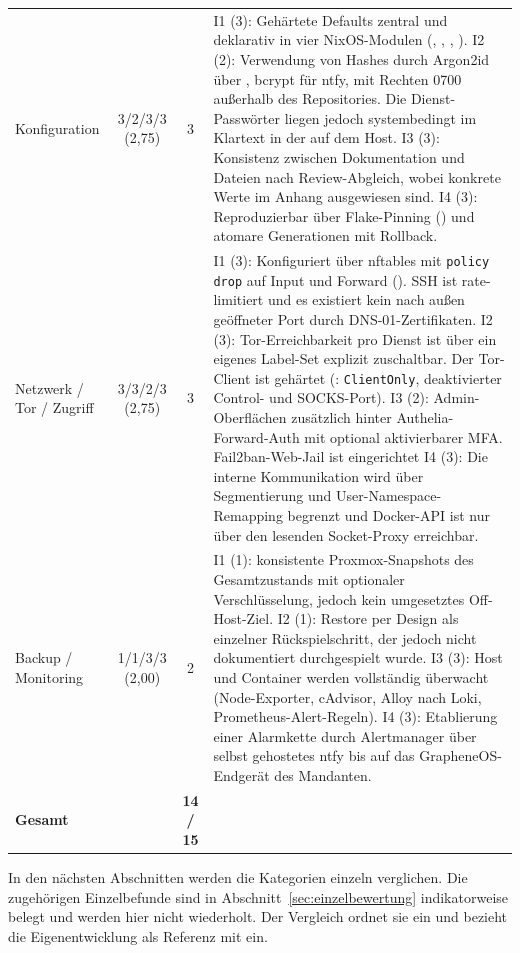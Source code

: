 \begin{xltabular}{\linewidth}{@{} p{2.9cm} c c >{\RaggedRight\arraybackslash}X @{}}
\addlinespace
Konfiguration & 3/2/3/3 (2{,}75) & 3 &
I1 (3): Gehärtete Defaults zentral und deklarativ in vier NixOS-Modulen (, , , ).
I2 (2): Verwendung von Hashes durch Argon2id über , bcrypt für ntfy,  mit Rechten 0700 außerhalb des Repositories. Die Dienst-Passwörter liegen jedoch systembedingt im Klartext in der  auf dem Host.
I3 (3): Konsistenz zwischen Dokumentation und Dateien nach Review-Abgleich, wobei konkrete Werte im Anhang ausgewiesen sind.
I4 (3): Reproduzierbar über Flake-Pinning () und atomare Generationen mit Rollback. \\
\addlinespace
Netzwerk / Tor / Zugriff & 3/3/2/3 (2{,}75) & 3 &
I1 (3): Konfiguriert über nftables mit \texttt{policy drop} auf Input und Forward (). \ac{SSH} ist rate-limitiert und es existiert kein nach außen geöffneter Port durch \ac{DNS}-01-Zertifikaten.
I2 (3): Tor-Erreichbarkeit pro Dienst ist über ein eigenes Label-Set explizit zuschaltbar. Der Tor-Client  ist gehärtet (: \texttt{ClientOnly}, deaktivierter Control- und \ac{SOCKS}-Port).
I3 (2): Admin-Oberflächen zusätzlich hinter Authelia-Forward-Auth mit optional aktivierbarer \acs{MFA}. Fail2ban-Web-Jail ist eingerichtet
I4 (3): Die interne Kommunikation wird über Segmentierung und User-Namespace-Remapping begrenzt und Docker-\ac{API} ist nur über den lesenden Socket-Proxy erreichbar. \\
\addlinespace
Backup / Monitoring & 1/1/3/3 (2{,}00) & 2 &
I1 (1): konsistente Proxmox-Snapshots des Gesamtzustands mit optionaler Verschlüsselung, jedoch kein umgesetztes Off-Host-Ziel.
I2 (1): Restore per Design als einzelner Rückspielschritt, der jedoch nicht dokumentiert durchgespielt wurde.
I3 (3): Host und Container werden vollständig überwacht (Node-Exporter, cAdvisor, Alloy nach Loki, Prometheus-Alert-Regeln).
I4 (3): Etablierung einer Alarmkette durch Alertmanager über selbst gehostetes ntfy bis auf das GrapheneOS-Endgerät des Mandanten. \\
\midrule
\textbf{Gesamt} & & \textbf{14 / 15} &  \\
\end{xltabular}
\endgroup

In den nächsten Abschnitten werden die Kategorien einzeln verglichen. Die zugehörigen Einzelbefunde sind in Abschnitt~\ref{sec:einzelbewertung} indikatorweise belegt und werden hier nicht wiederholt. Der Vergleich ordnet sie ein und bezieht die Eigenentwicklung als Referenz mit ein.


